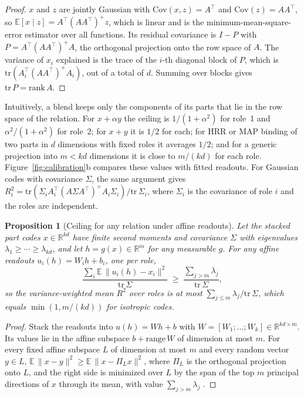 \documentclass[10pt]{article}
\theoremstyle{plain}
\newtheorem{proposition}{Proposition}
\theoremstyle{remark}
\newcommand{\R}{\mathbb{R}}
\begin{document}
\begin{proof}
$x$ and $z$ are jointly Gaussian with $\mathrm{Cov}(x, z) = A^{\top}$ and $\mathrm{Cov}(z) = AA^{\top}$, so $\mathbb{E}[x \mid z] = A^{\top}(AA^{\top})^{+}z$, which is linear and is the minimum-mean-square-error estimator over all functions. Its residual covariance is $I - P$ with $P = A^{\top}(AA^{\top})^{+}A$, the orthogonal projection onto the row space of $A$. The variance of $x_i$ explained is the trace of the $i$-th diagonal block of $P$, which is $\mathrm{tr}(A_i^{\top}(AA^{\top})^{+}A_i)$, out of a total of $d$. Summing over blocks gives $\mathrm{tr}\,P = \mathrm{rank}\,A$.
\end{proof}

\noindent
Intuitively, a blend keeps only the components of its parts that lie in the row space of the relation. For $x + \alpha y$ the ceiling is $1/(1 + \alpha^2)$ for role~1 and $\alpha^2/(1 + \alpha^2)$ for role~2; for $x + y$ it is $1/2$ for each; for HRR or MAP binding of two parts in $d$ dimensions with fixed roles it averages $1/2$; and for a generic projection into $m < kd$ dimensions it is close to $m/(kd)$ for each role. Figure~\ref{fig:calibration}b compares these values with fitted readouts. For Gaussian codes with covariance $\Sigma$, the same argument gives $R^2_i = \mathrm{tr}(\Sigma_i A_i^{\top}(A\Sigma A^{\top})^{+}A_i\Sigma_i)/\mathrm{tr}\,\Sigma_i$, where $\Sigma_i$ is the covariance of role $i$ and the roles are independent.

\begin{proposition}[Ceiling for any relation under affine readouts]
\label{prop:ey}
Let the stacked part codes $x \in \R^{kd}$ have finite second moments and covariance $\Sigma$ with eigenvalues $\lambda_1 \ge \cdots \ge \lambda_{kd}$, and let $h = g(x) \in \R^m$ for any measurable $g$. For any affine readouts $u_i(h) = W_i h + b_i$, one per role,
\begin{equation}
  \frac{\sum_i \mathbb{E}\,\lVert u_i(h) - x_i \rVert^2}{\mathrm{tr}\,\Sigma} \;\ge\; \frac{\sum_{j > m} \lambda_j}{\mathrm{tr}\,\Sigma},
\end{equation}
so the variance-weighted mean $R^2$ over roles is at most $\sum_{j \le m} \lambda_j / \mathrm{tr}\,\Sigma$, which equals $\min(1, m/(kd))$ for isotropic codes.
\end{proposition}

\begin{proof}
Stack the readouts into $u(h) = Wh + b$ with $W = [W_1; \ldots; W_k] \in \R^{kd \times m}$. Its values lie in the affine subspace $b + \mathrm{range}\,W$ of dimension at most $m$. For every fixed affine subspace $L$ of dimension at most $m$ and every random vector $y \in L$, $\mathbb{E}\,\lVert x - y \rVert^2 \ge \mathbb{E}\,\lVert x - \Pi_L x \rVert^2$, where $\Pi_L$ is the orthogonal projection onto $L$, and the right side is minimized over $L$ by the span of the top $m$ principal directions of $x$ through its mean, with value $\sum_{j > m} \lambda_j$ \citep{eckart1936}.
\end{proof}
\end{document}
